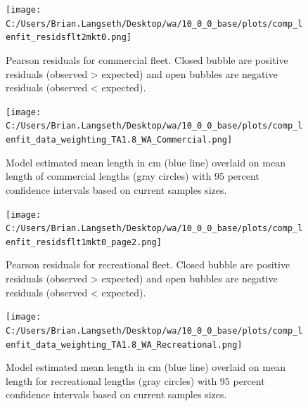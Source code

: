 \documentclass[11pt,
  english,
  letterpaper,
]{article}
\begin{document}
\tagmcend\tagstructend


\begin{figure}
\centering
\texttt{[image: C:/Users/Brian.Langseth/Desktop/wa/10\_0\_0\_base/plots/comp\_lenfit\_residsflt2mkt0.png]}
\caption{Pearson residuals for commercial fleet. Closed bubble are positive residuals (observed \textgreater{} expected) and open bubbles are negative residuals (observed \textless{} expected).\label{fig:com-pearson}}
\end{figure}

\tagmcend\tagstructend


\begin{figure}
\centering
\texttt{[image: C:/Users/Brian.Langseth/Desktop/wa/10\_0\_0\_base/plots/comp\_lenfit\_data\_weighting\_TA1.8\_WA\_Commercial.png]}
\caption{Model estimated mean length in cm (blue line) overlaid on mean length of commercial lengths (gray circles) with 95 percent confidence intervals based on current samples sizes.\label{fig:com-mean-len-fit}}
\end{figure}

\tagmcend\tagstructend


\begin{figure}
\centering
\texttt{[image: C:/Users/Brian.Langseth/Desktop/wa/10\_0\_0\_base/plots/comp\_lenfit\_residsflt1mkt0\_page2.png]}
\caption{Pearson residuals for recreational fleet. Closed bubble are positive residuals (observed \textgreater{} expected) and open bubbles are negative residuals (observed \textless{} expected).\label{fig:rec-pearson}}
\end{figure}

\tagmcend\tagstructend


\begin{figure}
\centering
\texttt{[image: C:/Users/Brian.Langseth/Desktop/wa/10\_0\_0\_base/plots/comp\_lenfit\_data\_weighting\_TA1.8\_WA\_Recreational.png]}
\caption{Model estimated mean length in cm (blue line) overlaid on mean length for recreational lengths (gray circles) with 95 percent confidence intervals based on current samples sizes.\label{fig:rec-mean-len-fit}}
\end{figure}
\end{document}

